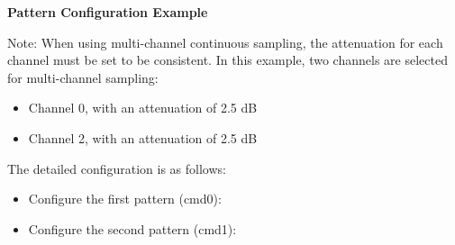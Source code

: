 \documentclass[main\_\_EN.tex]{subfiles}
\begin{document}
\textbf{Pattern Configuration Example}

Note: When using multi-channel continuous sampling, the attenuation for each channel must be set to be consistent. In this example, two channels are selected for multi-channel sampling:

\begin{itemize}
    \item Channel 0, with an attenuation of 2.5 dB
    \item Channel 2, with an attenuation of 2.5 dB
\end{itemize}

The detailed configuration is as follows:

\begin{itemize}
    \item Configure the first pattern (cmd0):

\centering
{}%
%
%
\reglabel{}\regnewline%
\begin{regdesc}\end{regdesc}
\end{itemize}

\begin{itemize}
    \item Configure the second pattern (cmd1):

\centering
{}%
%
%
\reglabel{}\regnewline%
\begin{regdesc}\end{regdesc}
\end{itemize}
\end{document}
